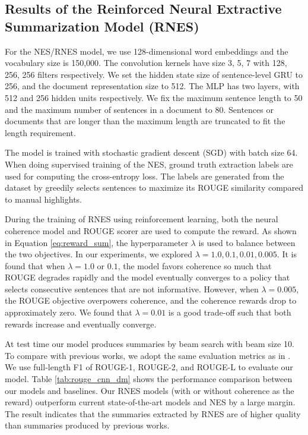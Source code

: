 \documentclass[letterpaper]{article} \usepackage{aaai18}  \usepackage{times}  \usepackage{helvet}  \usepackage{courier}  \usepackage{url}  \usepackage{graphicx}  \usepackage{amssymb}
\begin{document}
	\subsection{Results of the Reinforced Neural Extractive Summarization Model (RNES)}
	For the NES/RNES model, we use 128-dimensional word embeddings and the vocabulary size is 150,000. The convolution kernels have size 3, 5, 7 with 128, 256, 256 filters respectively. We set the hidden state size of sentence-level GRU to 256, and the document representation size to 512. The MLP has two layers, with 512 and 256 hidden units respectively. We fix the maximum sentence length to 50 and the maximum number of sentences in a document to 80. Sentences or documents that are longer than the maximum length are truncated to fit the length requirement.
	
	The model is trained with stochastic gradient descent (SGD) with batch size 64. When doing supervised training of the NES, ground truth extraction labels are used for computing the cross-entropy loss. The labels are generated from the dataset by greedily selects sentences to maximize its ROUGE similarity compared to manual highlights.
	
	During the training of RNES using reinforcement learning, both the neural coherence model and ROUGE scorer are used to compute the reward. As shown in Equation \ref{eq:reward_sum}, the hyperparameter $\lambda$ is used to balance between the two objectives. In our experiments, we explored $\lambda=1.0, 0.1, 0.01, 0.005$. It is found that when $\lambda=1.0$ or $0.1$, the model favors coherence so much that ROUGE degrades rapidly and the model eventually converges to a policy that selects consecutive sentences that are not informative. However, when $\lambda = 0.005$, the ROUGE objective overpowers coherence, and the coherence rewards drop to approximately zero. We found that $\lambda=0.01$ is a good trade-off such that both rewards increase and eventually converge.
	
	At test time our model produces summaries by beam search with beam size 10. To compare with previous works, we adopt the same evaluation metrics as in \cite{SummaRuNNer}. We use full-length F1 of ROUGE-1, ROUGE-2, and ROUGE-L to evaluate our model. Table \ref{tab:rouge_cnn_dm} shows the performance comparison between our models and baselines. Our RNES models (with or without coherence as the reward) outperform current state-of-the-art models and NES by a large margin. The result indicates that the summaries extracted by RNES are of higher quality than summaries produced by previous works.
	
\end{document}

